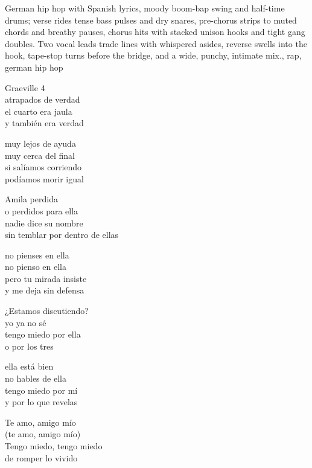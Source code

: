 

\begin{notes}
\end{notes}
\begin{style}
German hip hop with Spanish lyrics, moody boom-bap swing and half-time drums; verse rides tense bass pulses and dry snares, pre-chorus strips to muted chords and breathy pauses, chorus hits with stacked unison hooks and tight gang doubles. %
Two vocal leads trade lines with whispered asides, reverse swells into the hook, tape-stop turns before the bridge, and a wide, punchy, intimate mix., rap, german hip hop
\end{style}
\begin{lyrics}
Graeville 4\\
atrapados de verdad\\
el cuarto era jaula\\
y también era verdad

muy lejos de ayuda\\
muy cerca del final\\
si salíamos corriendo\\
podíamos morir igual

Amila perdida\\
o perdidos para ella\\
nadie dice su nombre\\
sin temblar por dentro de ellas

no pienses en ella\\
no pienso en ella\\
pero tu mirada insiste\\
y me deja sin defensa

¿Estamos discutiendo?\\
yo ya no sé\\
tengo miedo por ella\\
o por los tres

ella está bien\\
no hables de ella\\
tengo miedo por mí\\
y por lo que revelas

Te amo, amigo mío\\
(te amo, amigo mío)\\
Tengo miedo, tengo miedo\\
de romper lo vivido


\end{lyrics}
